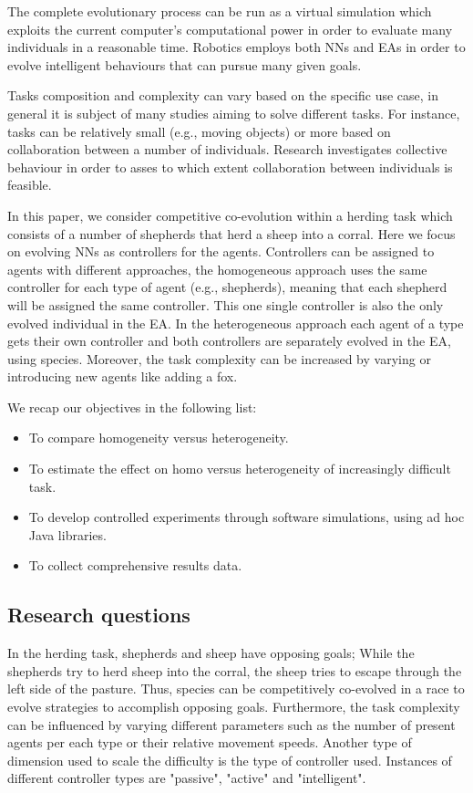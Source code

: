 \documentclass[conference]{IEEEtran}
\begin{document}
The complete evolutionary process can be run as a virtual simulation which exploits the current computer's computational power in order to evaluate many individuals in a reasonable time. Robotics employs both NNs and EAs in order to evolve intelligent behaviours that can pursue many given goals.

Tasks composition and complexity can vary based on the specific use case, in general it is subject of many studies aiming to solve different tasks.
For instance, tasks can be relatively small (e.g., moving objects) or more based on collaboration between a number of individuals.
Research investigates collective behaviour in order to asses to which extent collaboration between individuals is feasible.  

In this paper, we consider competitive co-evolution within a herding task which consists of a number of shepherds that herd a sheep into a corral.
Here we focus on evolving NNs as controllers for the agents.
Controllers can be assigned to agents with different approaches, the homogeneous approach uses the same controller for each type of agent (e.g., shepherds), meaning that each shepherd will be assigned the same controller. This one single controller is also the only evolved individual in the EA. In the heterogeneous approach each agent of a type gets their own controller and both controllers are separately evolved in the EA, using species.
Moreover, the task complexity can be increased by varying or introducing new agents like adding a fox.

We recap our objectives in the following list:

\begin{itemize}
	\item To compare homogeneity versus heterogeneity.
	\item To estimate the effect on homo versus heterogeneity of increasingly difficult task.
 	\item To develop controlled experiments through software simulations, using ad hoc Java libraries.
	\item To collect comprehensive results data.
\end{itemize}
 
\subsection{Research questions}
In the herding task, shepherds and sheep have opposing goals;
While the shepherds try to herd sheep into the corral, the sheep tries to escape through the left side of the pasture. Thus, species can be competitively co-evolved in a race to evolve strategies to accomplish opposing goals. Furthermore, the task complexity can be influenced by varying different parameters such as the number of present agents per each type or their relative movement speeds. Another type of dimension used to scale the difficulty is the type of controller used. Instances of different controller types are "passive", "active" and "intelligent". 
\end{document}
